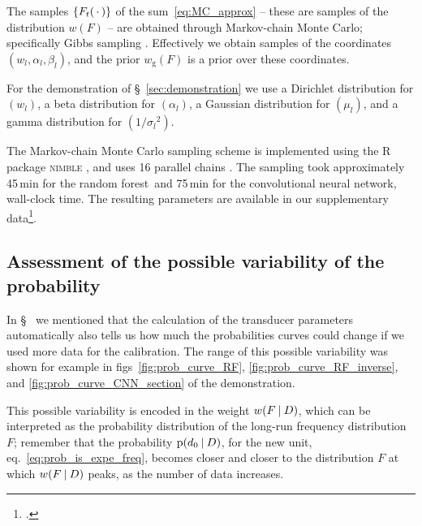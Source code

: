 \documentclass[\ifafour a4paper,12pt,\else a5paper,10pt,\fi%
onecolumn,oneside,article,%
british%
]{memoir}
\theoremstyle{remark}
\theoremstyle{innote}
\newcommand*{\wrench}{{\fontencoding{U}\fontfamily{fontawesomethree}\selectfont\symbol{114}}}
\newcommand{\mynotew}[1]{{\footnotesize\color{notecolour}\wrench\ #1}}
\newcommand*{\dotv}{\mathord{\,\cdot\,}}%
\DeclarePairedDelimiter\set{\{}{\}} %
\newcommand*{\p}{\mathrm{p}}%
\renewcommand*{\|}[1][]{\nonscript\:#1\vert\nonscript\:\mathopen{}}
\newcommand*{\sect}{\S}%
\newcommand*{\chap}{ch.}%
\newcommand*{\eqn}{eq.}%
\newcommand*{\figs}{figs}%
\newcommand*{\wf}{w}
\newcommand*{\wfo}{w_{\textrm{g}}}
\newcommand*{\RF}{random forest}
\newcommand*{\CNN}{convolutional neural network}
\begin{document}
\medskip


The samples $\set{F_{t}(\dotv)}$ of the sum~\eqref{eq:MC_approx} -- these are samples of the distribution $\wf(F)$ -- are obtained through Markov-chain Monte Carlo; specifically Gibbs sampling \autocites{neal1993}[\chap~29]{mackay1995_r2005}.
Effectively we obtain samples of the coordinates $(w_{l}, \alpha_{l}, \beta_{l})$, and the prior $\wfo(F)$ is a prior over these coordinates.

For the demonstration of \sect~\ref{sec:demonstration} we use a Dirichlet distribution for $(w_{l})$, a beta distribution for $(\alpha_{l})$, a Gaussian distribution for $(\mu_{l})$, and a gamma distribution for $(1/{\sigma_{l}}^{2})$.

The Markov-chain Monte Carlo sampling scheme is implemented using the R \autocites{rcoreteam1995_r2022} package \textsc{nimble} \autocites{nimble2016_r2021}, and uses 16 parallel chains \autocites[\addcomma\ scripts \texttt{RFmcmc.R} and \texttt{NNmcmc.R}]{dyrlandetal2022c}. The sampling took approximately 45\,min for the \RF\ and 75\,min for the \CNN, wall-clock time. The resulting parameters are available in our supplementary data\footcites[\addcomma\ files \texttt{transducer\_params-Random\_Forest.zip} and \texttt{transducer\_params-Neural\_Net.zip}]{dyrlandetal2022c}.

\subsection{Assessment of the possible variability of the probability}
\label{sec:variability_prob}

In \sect\mynotew{} we mentioned that the calculation of the transducer parameters automatically also tells us how much the probabilities curves could change if we used more data for the calibration. The range of this possible variability was shown for example in \figs~\ref{fig:prob_curve_RF}, \ref{fig:prob_curve_RF_inverse}, and \ref{fig:prob_curve_CNN_section} of the demonstration.

This possible variability is encoded in the weight $\wf(F \| D)$, which can be interpreted as the probability distribution of the long-run frequency distribution $F$; remember that the probability $\p(d_{0} \| D)$, for the new unit, \eqn~\eqref{eq:prob_is_expe_freq}, becomes closer and closer to the distribution $F$ at which $\wf(F \| D)$ peaks, as the number of data increases.
\end{document}
